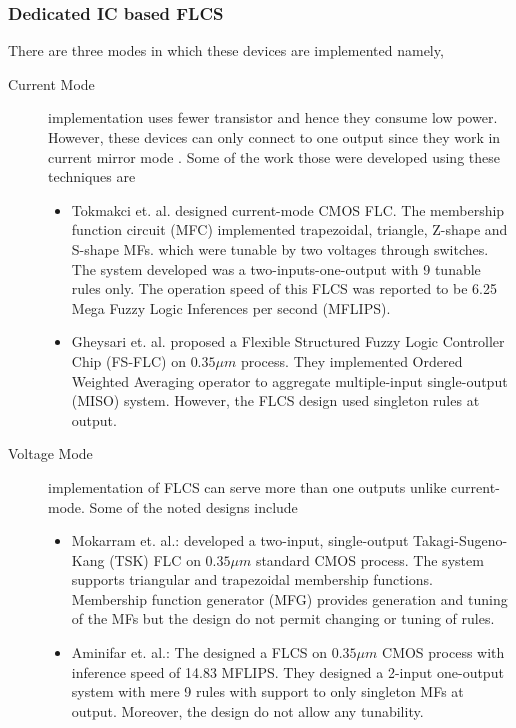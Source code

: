 \subsubsection{Dedicated IC based FLCS}
There are three modes in which these devices are implemented namely,
\begin{description}
	\item[Current Mode] implementation uses fewer transistor and hence they consume low power. However, these devices can only connect to one output since they work in current mirror mode \cite{Bosque2014b,Zavala2012}. Some of the work those were developed using these techniques are
	\begin{itemize}
		\item Tokmakci et. al.\cite{TokmakcI2008} designed current\hyp{}mode CMOS FLC. The membership function circuit (MFC) implemented trapezoidal, triangle, Z\hyp{}shape and S\hyp{}shape MFs. which were tunable by two voltages through switches.{ The system developed was a two\hyp{}inputs\hyp{}one\hyp{}output with 9 tunable rules only}. The operation speed of this FLCS was reported to be 6.25 Mega Fuzzy Logic Inferences per second (MFLIPS)\cite{TokmakcI2008}.
		\item Gheysari et. al.\cite{Gheysari2011} proposed a Flexible Structured Fuzzy Logic Controller Chip (FS\hyp{}FLC) on $ 0.35 \mu m $ process. They implemented Ordered Weighted Averaging operator to aggregate multiple\hyp{}input single\hyp{}output (MISO) system.{ However, the FLCS design used singleton rules at output. }
	\end{itemize} 
	\item[Voltage Mode] implementation of FLCS can serve more than one outputs unlike current-mode. Some of the noted designs include
	\begin{itemize}
		\item Mokarram et. al.\cite{Mokarram2015}: developed a two\hyp{}input, single\hyp{}output Takagi\hyp{}Sugeno\hyp{}Kang (TSK) FLC on $ 0.35 \mu m $ standard CMOS process. The system supports triangular and trapezoidal membership functions. Membership function generator (MFG) provides generation and tuning of the MFs but {the design do not permit changing or tuning of rules}.
		\item Aminifar et. al.\cite{Aminifar2012}: The designed a FLCS on $ 0.35 \mu m $ CMOS process with inference speed of 14.83 MFLIPS. {They designed a 2\hyp{}input one\hyp{}output system with mere 9 rules with support to only singleton MFs at output. Moreover, the design do not allow any tunability.}
	\end{itemize} 
\end{description} 


